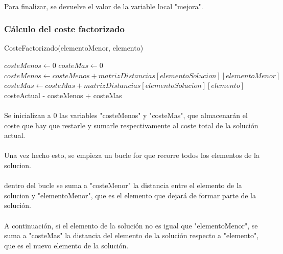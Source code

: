 \documentclass{article}
\begin{document}
	\paragraph{}Para finalizar, se devuelve el valor de la variable local "mejora".
	
	\paragraph{}

	\subsubsection{Cálculo del coste factorizado}
	\begin{algorithm}[H]
		\caption{CosteFactorizado(elementoMenor, elemento)}
		\begin{algorithmic}
			\STATE $costeMenos \leftarrow 0$
			\STATE $costeMas \leftarrow 0$
			\STATE $costeMenos \leftarrow costeMenos + matrizDistancias[elementoSolucion][elementoMenor]$
			\STATE $costeMas \leftarrow costeMas+matrizDistancias[elementoSolucion][elemento]$
			\ENDIF
			\ENDFOR
			\RETURN costeActual - costeMenos + costeMas	
		\end{algorithmic}
	\end{algorithm}
	
	\paragraph{}Se inicializan a 0 las variables "costeMenos" y "costeMas", que almacenarán el coste que hay que restarle y sumarle respectivamente al coste total de la solución actual.
	
	\paragraph{}Una vez hecho esto, se empieza un bucle for que recorre todos los elementos de la solucion.
	
	\paragraph{}dentro del bucle se suma a "costeMenor" la distancia entre el elemento de la solucion y "elementoMenor", que es el elemento que dejará de formar parte de la solución.
	
	\paragraph{}A continuación, si el elemento de la solución no es igual que "elementoMenor", se suma a "costeMas" la distancia del elemento de la solución respecto a "elemento", que es el nuevo elemento de la solución. 
	
\end{document}
